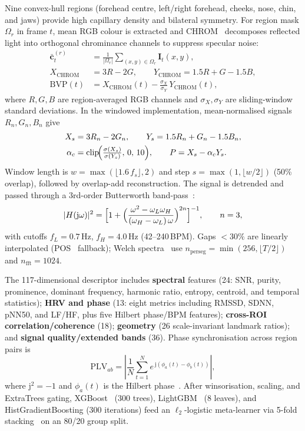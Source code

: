 \documentclass[runningheads]{llncs}
\DeclareMathOperator{\clip}{clip}
\begin{document}
Nine convex-hull regions (forehead centre, left/right forehead, cheeks, nose, chin, and jaws) provide high capillary density and bilateral symmetry. For region mask $\Omega_r$ in frame $t$, mean RGB colour is extracted and CHROM~\cite{dehaan2013chrom} decomposes reflected light into orthogonal chrominance channels to suppress specular noise:
\begin{align}
\bar{\mathbf c}^{(r)}_t&=\frac{1}{|\Omega_r|}\sum_{(x,y)\in\Omega_r}\mathbf I_t(x,y),\\
X_{\mathrm{CHROM}}&=3R-2G,\qquad Y_{\mathrm{CHROM}}=1.5R+G-1.5B,\\
\mathrm{BVP}(t)&=X_{\mathrm{CHROM}}(t)-\frac{\sigma_X}{\sigma_Y}\,Y_{\mathrm{CHROM}}(t),
\end{align}
where $R,G,B$ are region-averaged RGB channels and $\sigma_X,\sigma_Y$ are sliding-window standard deviations. In the windowed implementation, mean-normalised signals $R_n,G_n,B_n$ give
\begin{align}
X_s&=3R_n-2G_n,\qquad Y_s=1.5R_n+G_n-1.5B_n,\\
\alpha_c&=\clip\!\Bigl(\tfrac{\sigma(X_s)}{\sigma(Y_s)},\,0,\,10\Bigr),\qquad P=X_s-\alpha_c Y_s.
\end{align}
Window length is $w=\max(\lfloor 1.6\,f_s\rfloor,2)$ and step $s=\max(1,\lfloor w/2\rfloor)$ (50\% overlap), followed by overlap-add reconstruction. The signal is detrended and passed through a 3rd-order Butterworth band-pass~\cite{butterworth1930}:
\begin{equation}
\lvert H(\mathrm{j}\omega)\rvert^{2}=\Bigl[1+\Bigl(\frac{\omega^{2}-\omega_L\omega_H}{(\omega_H-\omega_L)\,\omega}\Bigr)^{2n}\Bigr]^{-1},\qquad n=3,
\end{equation}
with cutoffs $f_L{=}0.7$\,Hz, $f_H{=}4.0$\,Hz (42--240\,BPM). Gaps ${<}30\%$ are linearly interpolated (POS~\cite{wang2017pos} fallback); Welch spectra~\cite{welch1967} use $n_{\mathrm{perseg}}{=}\min(256,\lfloor T/2\rfloor)$ and $n_{\mathrm{fft}}{=}1024$.

The 117-dimensional descriptor includes \textbf{spectral} features (24: SNR, purity, prominence, dominant frequency, harmonic ratio, entropy, centroid, and temporal statistics); \textbf{HRV and phase} (13: eight metrics including RMSSD, SDNN, pNN50, and LF/HF, plus five Hilbert phase/BPM features); \textbf{cross-ROI correlation/coherence} (18); \textbf{geometry} (26 scale-invariant landmark ratios); and \textbf{signal quality/extended bands} (36). Phase synchronisation across region pairs is
\begin{equation}
\mathrm{PLV}_{ab}=\left|\frac{1}{N}\sum_{t=1}^{N}e^{\,\mathrm{j}(\phi_a(t)-\phi_b(t))}\right|,
\end{equation}
where $\mathrm{j}^{2}{=}-1$ and $\phi_a(t)$ is the Hilbert phase~\cite{lachaux1999plv}. After winsorisation, scaling, and ExtraTrees gating, XGBoost~\cite{chen2016xgboost} (300 trees), LightGBM~\cite{ke2017lightgbm} (8 leaves), and HistGradientBoosting (300 iterations) feed an $\ell_2$-logistic meta-learner via 5-fold stacking~\cite{wolpert1992stacking} on an 80/20 group split.
\end{document}
